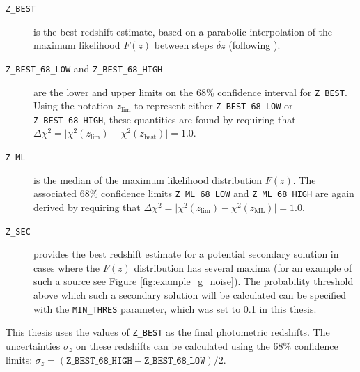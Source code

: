 \begin{description}
\item[\texttt{Z\_BEST}] is the best redshift estimate, based on a parabolic interpolation of the maximum likelihood $F(z)$ between steps $\delta z$ (following \citealt{1969drea.book.....B}).


\item[\texttt{Z\_BEST\_68\_LOW} and \texttt{Z\_BEST\_68\_HIGH}] are the lower and upper limits on the 68\% confidence interval for \texttt{Z\_BEST}. Using the notation $z_{\mathrm{lim}}$ to represent either \texttt{Z\_BEST\_68\_LOW} or \texttt{Z\_BEST\_68\_HIGH}, these quantities are found by requiring that $\Delta \chi^2 = \lvert \chi^2(z_{\mathrm{lim}}) - \chi^2(z_{\mathrm{best}}) \vert= 1.0$.


\item[\texttt{Z\_ML}] is the median of the maximum likelihood distribution $F(z)$. The associated 68\% confidence limits \texttt{Z\_ML\_68\_LOW} and \texttt{Z\_ML\_68\_HIGH} are again derived by requiring that $\Delta \chi^2 = \lvert \chi^2(z_{\mathrm{lim}}) - \chi^2(z_{\mathrm{ML}}) \vert= 1.0$.

\item[\texttt{Z\_SEC}] provides the best redshift estimate for a potential secondary solution in cases where the $F(z)$ distribution has several maxima (for an example of such a source see Figure \ref{fig:example_g_noise}). The probability threshold above which such a secondary solution will be calculated can be specified with the \texttt{MIN\_THRES} parameter, which was set to 0.1 in this thesis. 

\end{description}

\noindent This thesis uses the values of \texttt{Z\_BEST} as the final photometric redshifts. The uncertainties $\sigma_{z}$ on these redshifts can be calculated using the 68\% confidence limits: $\sigma_{z} = (\texttt{Z\_BEST\_68\_HIGH} - \texttt{Z\_BEST\_68\_LOW})/2$. \par


